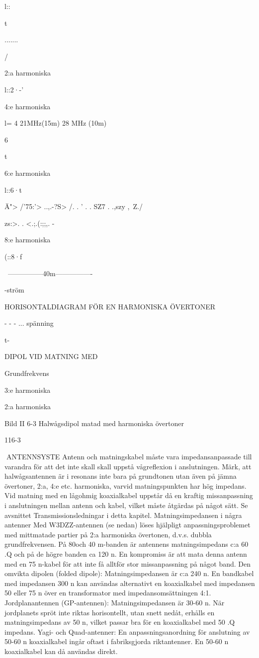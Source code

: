 {{l::

t

.......

/

2:a harmoniska

l::2·-'}

4:e harmoniska

l= 4
21MHz(15m)
28 MHz (10m)

6

t

6:e harmoniska

l::6·t

Ä"> /'75:'> ..,.-?S> /. .
' . . SZ7 . .,szy ,\ Z./

zs:>. . <.;.(:;;,. -

8:e harmoniska

(::8·f

~---------------40m----------------~

-ström

HORISONTALDIAGRAM FÖR EN
HARMONISKA ÖVERTONER

- - - ... spänning

t-

DIPOL VID MATNING MED

Grundfrekvens

3:e harmoniska

2:a harmoniska

Bild II 6-3 Halwågsdipol matad med harmoniska övertoner

116-3

ANTENNSYSTE
Antenn och matningskabel måste vara
impedansanpassade till varandra för att det
inte skall skall uppstå vågreflexion i anslutningen.
Märk, att halwågsantennen är i resonans inte bara på grundtonen utan även på
jämna övertoner, 2:a, 4:e etc. harmoniska,
varvid matningspunkten har hög impedans.
Vid matning med en lågohmig koaxialkabel
uppstår då en kraftig missanpassning i anslutningen mellan antenn och kabel, vilket
måste åtgärdas på något sätt. Se avsnittet
Transmissionsledningar i detta kapitel.
Matningsimpedansen i några antenner
Med W3DZZ-antennen (se nedan) löses
hjälpligt anpassningsproblemet med mittmatade partier på 2:a harmoniska övertonen, d.v.s. dubbla grundfrekvensen. På 80och 40 m-banden är antennens matningsimpedans c:a 60 .Q och på de högre banden
ca 120 n. En kompromiss är att mata denna
antenn med en 75 n-kabel för att inte få
alltför stor missanpassning på något band.
Den omvikta dipolen (folded dipole):
Matningsimpedansen är c:a 240 n. En
bandkabel med impedansen 300 n kan användas alternativt en koaxialkabel med
impedansen 50 eller 75 n över en transformator med impedansomsättningen 4:1.
Jordplanantennen (GP-antennen):
Matningsimpedansen är 30-60 n. När
jordplanets spröt inte riktas horisontellt, utan
snett nedåt, erhålls en matningsimpedans
av 50 n, vilket passar bra för en koaxialkabel med 50 .Q impedans.
Yagi- och Quad-antenner:
En anpassningsanordning för anslutning
av 50-60 n koaxialkabel ingår oftast i fabriksgjorda riktantenner. En 50-60 n koaxialkabel kan då användas direkt.

}
